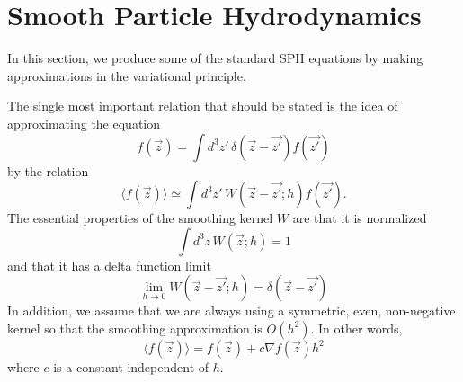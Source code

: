     \section{Smooth Particle Hydrodynamics}\label{sph}
In this section, we produce some of the standard SPH equations
by making approximations in the variational principle.

The single most important relation that should be stated is the idea of
approximating the equation
    \begin{equation}
    f({\vec z}) = \int\!\! d^3z'\,\delta({\vec z} - \vec{ z'}) f(\vec{z'})
    \end{equation}
by the relation
    \begin{equation}\label{sph_fun}
    \langle f({\vec z}) \rangle \simeq \int\!\! d^3z'\,W({\vec z} 
    - \vec{z'}; h) f(\vec{z'}).
    \end{equation} The essential properties of the smoothing kernel
$W$ are that it is normalized
    \begin{equation}\label{norm}
    \int\!\! d^3z\,W({\vec z};h) = 1
    \end{equation}
and that it has a delta function limit
    \begin{equation}
    \lim_{h \rightarrow 0} W({\vec z} - \vec{z'};h) = \delta({\vec z}
    - \vec{z'})
    \end{equation} In addition, we assume that we are always using a
symmetric, even, non-negative kernel so that the smoothing
approximation is $O(h^2)$.  In other words,
    \begin{equation}
    \langle f({\vec z}) \rangle = f({\vec z}) + c\nabla f({\vec z}) h^2
    \end{equation}
where $c$ is a constant independent of $h$.  


